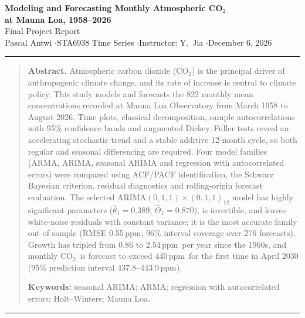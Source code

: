 \documentclass[11pt,letterpaper]{article}
\newcommand{\co}{CO$_2$}
\newcommand{\ppm}{\,ppm}
\begin{document}
\thispagestyle{fancy}
\begin{center}
  {\LARGE\bfseries\color{accent} Modeling and Forecasting Monthly Atmospheric \co\\[2pt] at Mauna Loa, 1958--2026}\\[8pt]
  {\large Final Project Report}\\[6pt]
  {\normalsize Pascal Antwi \quad$\cdot$\quad STA6938 Time Series \quad$\cdot$\quad Instructor: Y.~Jia \quad$\cdot$\quad December 6, 2026}
\end{center}
\vspace{-6pt}
\noindent\rule{\linewidth}{0.4pt}
\vspace{-8pt}
\begin{quote}\small
\noindent\textbf{Abstract.}
Atmospheric carbon dioxide (\co) is the principal driver of anthropogenic climate change, and its rate of increase is central to climate policy. This study models and forecasts the 822 monthly mean concentrations recorded at Mauna Loa Observatory from March 1958 to August 2026. Time plots, classical decomposition, sample autocorrelations with 95\% confidence bands and augmented Dickey--Fuller tests reveal an accelerating stochastic trend and a stable additive 12-month cycle, so both regular and seasonal differencing are required. Four model families (ARMA, ARIMA, seasonal ARIMA and regression with autocorrelated errors) were compared using ACF/PACF identification, the Schwarz Bayesian criterion, residual diagnostics and rolling-origin forecast evaluation. The selected ARIMA$(0,1,1)\times(0,1,1)_{12}$ model has highly significant parameters ($\hat\theta_1=0.389$, $\hat\Theta_1=0.870$), is invertible, and leaves white-noise residuals with constant variance; it is the most accurate family out of sample (RMSE 0.55\ppm, 96\% interval coverage over 276 forecasts). Growth has tripled from 0.86 to 2.54\ppm\ per year since the 1960s, and monthly \co\ is forecast to exceed 440\ppm\ for the first time in April 2030 (95\% prediction interval 437.8--443.9\ppm).

\noindent\textbf{Keywords:} seasonal ARIMA; ARMA; regression with autocorrelated errors; Holt--Winters; Mauna Loa.
\end{quote}
\vspace{-10pt}
\noindent\rule{\linewidth}{0.4pt}
\vspace{-14pt}

\end{document}

